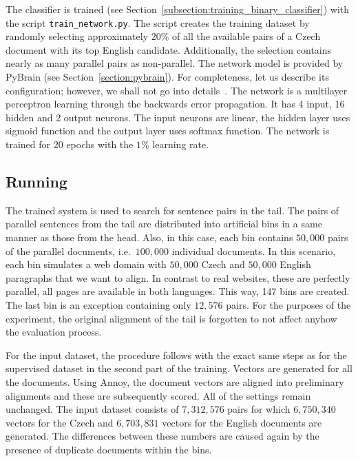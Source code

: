 The classifier is trained (see Section~\ref{subsection:training_binary_classifier}) with the script \texttt{train\_network.py}. The script creates the training dataset by randomly selecting approximately $20\%$ of all the available pairs of a Czech document with its top English candidate. Additionally, the selection contains nearly as many parallel pairs as non-parallel. The network model is provided by PyBrain (see Section~\ref{section:pybrain}). For completeness, let us describe its configuration; however, we shall not go into details~\cite{Sima96}. The network is a multilayer perceptron learning through the backwards error propagation. It has 4 input, 16 hidden and 2 output neurons. The input neurons are linear, the hidden layer uses sigmoid function and the output layer uses softmax function. The network is trained for $20$ epochs with the $1\%$ learning rate.

\subsection{Running}
\label{subsection:czeng_experiment_running}

The trained system is used to search for sentence pairs in the tail. The pairs of parallel sentences from the tail are distributed into artificial bins in a same manner as those from the head. Also, in this case, each bin contains $50,000$ pairs of the parallel documents, i.e.\ $100,000$ individual documents. In this scenario, each bin simulates a web domain with $50,000$ Czech and $50,000$ English paragraphs that we want to align. In contrast to real websites, these are perfectly parallel, all pages are available in both languages. This way, 147 bins are created. The last bin is an exception containing only $12,576$ pairs. For the purposes of the experiment, the original alignment of the tail is forgotten to not affect anyhow the evaluation process.

For the input dataset, the procedure follows with the exact same steps as for the supervised dataset in the second part of the training. Vectors are generated for all the documents. Using Annoy, the document vectors are aligned into preliminary alignments and these are subsequently scored. All of the settings remain unchanged. The input dataset consists of $7,312,576$ pairs for which $6,750,340$ vectors for the Czech and $6,703,831$ vectors for the English documents are generated. The differences between these numbers are caused again by the presence of duplicate documents within the bins.

